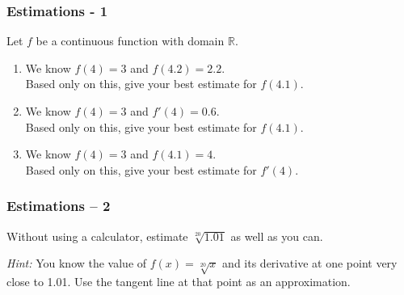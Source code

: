 \documentclass[14pt]{beamer}
\begin{document}
	\begin{frame}
		\frametitle{Estimations - 1}

		Let $f$ be a continuous function with domain $\mathbb{R}$.

		\vfill

		\begin{enumerate}
			\item We know $f(4)=3$ and $f(4.2)=2.2$. \\ Based only on this, give your best
				estimate for $f(4.1)$.
				\vfill

			\item We know $f(4)=3$ and $f'(4)=0.6$. \\ Based only on this, give your best
				estimate for $f(4.1)$.
				\vfill

			\item We know $f(4)=3$ and $f(4.1) = 4$. \\ Based only on this, give your best
				estimate for $f'(4)$.
		\end{enumerate}

		\vfill
	\end{frame}


	\begin{frame}
		\frametitle{Estimations -- 2}

		Without using a calculator, estimate $\displaystyle \sqrt[20]{1.01}$ as well
		as you can.

		\emph{Hint:} You know the value of $\displaystyle f(x) = \sqrt[20]{x}$ and
		its derivative at one point very close to 1.01. Use the tangent line at that
		point as an approximation.
	\end{frame}
\end{document}
